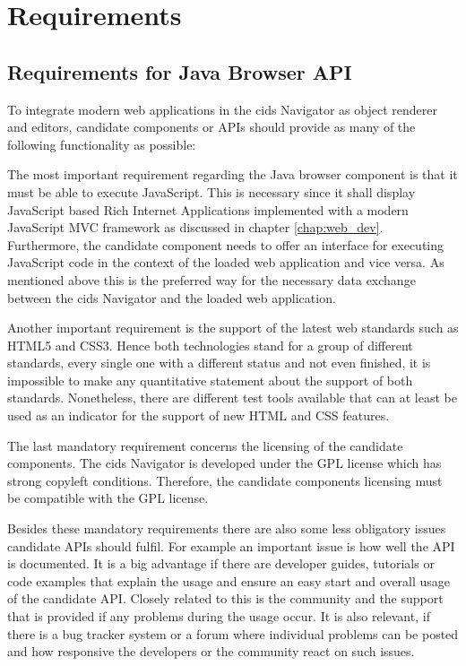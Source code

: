 \section{Requirements}\label{chap:requirements}
\subsection{Requirements for Java Browser API}\label{chap:conception_section:req-broser-api}

To integrate modern web applications in the cids Navigator as object renderer and editors, candidate components or APIs should provide as many of the following functionality as possible:

The most important requirement regarding the Java browser component is that it must be able to execute JavaScript.
This is necessary since it shall display JavaScript based Rich Internet Applications implemented with a modern JavaScript MVC framework as discussed in chapter \ref{chap:web_dev}.
Furthermore, the candidate component needs to offer an interface for executing JavaScript code in the context of the loaded web application and vice versa.
As mentioned above this is the preferred way for the necessary data exchange between the cids Navigator and the  loaded web application.

Another important requirement is the support of the latest web standards such as HTML5 and CSS3.
Hence both technologies stand for a group of different standards, every single one with a different status and not even finished, it is impossible to make any quantitative statement about the support of both standards.
Nonetheless, there are different test tools available that can at least be used as an indicator for the support of new HTML and CSS features.

The last mandatory requirement concerns the licensing of the candidate components.
The cids Navigator is developed under the GPL license which has strong copyleft conditions.
Therefore, the candidate components licensing must be compatible with the GPL license.

Besides these mandatory requirements there are also some less obligatory issues candidate APIs should fulfil.
For example an important issue is how well the API is documented.
It is a big advantage if there are developer guides, tutorials or code examples that explain the usage and ensure an easy start and overall usage of the candidate API.
Closely related to this is the community and the support that is provided if any problems during the usage occur.
It is also relevant, if there is a bug tracker system or a forum where individual problems can be posted and how responsive the developers or the community react on such issues.

